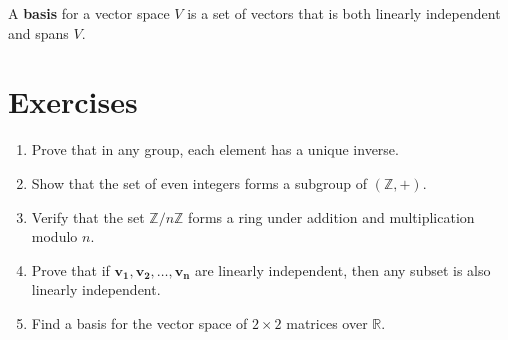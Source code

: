 \begin{definition}[Basis]
A \textbf{basis} for a vector space $V$ is a set of vectors that is both linearly independent and spans $V$.
\end{definition}

\section{Exercises}

\begin{enumerate}
    \item Prove that in any group, each element has a unique inverse.
    
    \item Show that the set of even integers forms a subgroup of $(\mathbb{Z}, +)$.
    
    \item Verify that the set $\mathbb{Z}/n\mathbb{Z}$ forms a ring under addition and multiplication modulo $n$.
    
    \item Prove that if $\mathbf{v_1}, \mathbf{v_2}, \ldots, \mathbf{v_n}$ are linearly independent, then any subset is also linearly independent.
    
    \item Find a basis for the vector space of $2 \times 2$ matrices over $\mathbb{R}$.
\end{enumerate}
